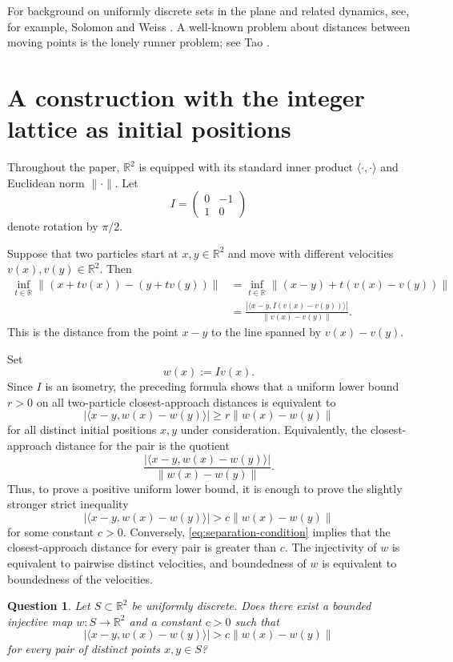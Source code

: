 \documentclass[11pt]{article}
\newtheorem{question}[theorem]{Question}
\theoremstyle{remark}
\begin{document}
For background on uniformly discrete sets in the plane and related dynamics, see, for example, Solomon and Weiss \cite{SolomonWeiss}. A well-known problem about distances between moving points is the lonely runner problem; see Tao \cite{TaoLonelyRunner}.

\section{A construction with the integer lattice as initial positions}

Throughout the paper, $\mathbb R^2$ is equipped with its standard inner product $\langle\cdot,\cdot\rangle$ and Euclidean norm $\|\cdot\|$. Let
\[
I=\begin{pmatrix}0&-1\\ 1&0\end{pmatrix}
\]
denote rotation by $\pi/2$.

Suppose that two particles start at $x,y\in\mathbb R^2$ and move with different velocities $v(x),v(y)\in\mathbb R^2$. Then
\begin{align*}
\inf_{t\in\mathbb R}\|(x+t v(x))-(y+t v(y))\|
&=\inf_{t\in\mathbb R}\|(x-y)+t(v(x)-v(y))\| \\
&=\frac{|\langle x-y, I(v(x)-v(y))\rangle|}{\|v(x)-v(y)\|} .
\end{align*}
This is the distance from the point $x-y$ to the line spanned by $v(x)-v(y)$.

Set
\[
w(x):=I v(x).
\]
Since $I$ is an isometry, the preceding formula shows that a uniform lower bound $r>0$ on all two-particle closest-approach distances is equivalent to
\[
\bigl|\langle x-y,w(x)-w(y)\rangle\bigr|\ge r\|w(x)-w(y)\|
\]
for all distinct initial positions $x,y$ under consideration. Equivalently, the closest-approach distance for the pair is the quotient
\[
\frac{\bigl|\langle x-y,w(x)-w(y)\rangle\bigr|}{\|w(x)-w(y)\|}.
\]
Thus, to prove a positive uniform lower bound, it is enough to prove the slightly stronger strict inequality
\begin{equation}\label{eq:separation-condition}
\bigl|\langle x-y,w(x)-w(y)\rangle\bigr|>c\|w(x)-w(y)\|
\end{equation}
for some constant $c>0$. Conversely, \eqref{eq:separation-condition} implies that the closest-approach distance for every pair is greater than $c$. The injectivity of $w$ is equivalent to pairwise distinct velocities, and boundedness of $w$ is equivalent to boundedness of the velocities.

\begin{question}\label{q:discrete}
Let $S\subset\mathbb R^2$ be uniformly discrete. Does there exist a bounded injective map $w:S\to\mathbb R^2$ and a constant $c>0$ such that
\[
\bigl|\langle x-y,w(x)-w(y)\rangle\bigr|>c\|w(x)-w(y)\|
\]
for every pair of distinct points $x,y\in S$?
\end{question}
\end{document}
